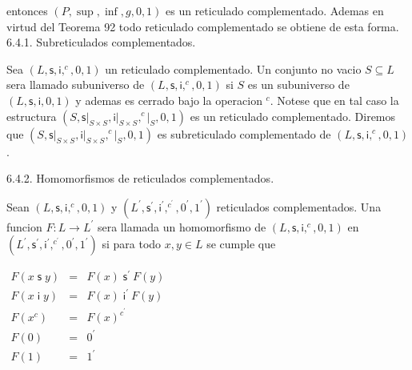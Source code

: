 entonces \((P,\sup ,\inf ,g,0,1)\) es un reticulado complementado. Ademas en virtud del Teorema 92 todo reticulado complementado se obtiene de esta forma.
6.4.1. Subreticulados complementados.

Sea \((L,\mathsf{s},\mathsf{i},^{c},0,1)\) un reticulado complementado. Un conjunto no vacio \(S\subseteq L\) sera llamado subuniverso de \((L, \mathsf{s},\mathsf{i},^{c},0,1)\) si \(S\) es un subuniverso de \((L,\mathsf{s}, \mathsf{i},0,1)\) y ademas es cerrado bajo la operacion \(^{c}\). Notese que en tal caso la estructura \((S,\mathsf{s}\mathrm{\mid }_{S\times S},\mathsf{i} \mathrm{\mid }_{S\times S},^{c}\mathrm{\mid }_{S},0,1)\) es un reticulado complementado. Diremos que \((S,\mathsf{s}\mathrm{\mid }_{S\times S},\mathsf{i }\mathrm{\mid }_{S\times S},^{c}\mathrm{\mid }_{S},0,1)\) es subreticulado complementado de \((L,\mathsf{s},\mathsf{i},^{c},0,1)\).

6.4.2. Homomorfismos de reticulados complementados.

Sean \((L,\mathsf{s},\mathsf{i},^{c},0,1)\) y \((L^{\prime },\mathsf{s}^{\prime },\mathsf{i}^{\prime },^{c^{\prime }},0^{\prime },1^{\prime })\) reticulados complementados. Una funcion \(F:L\rightarrow L^{\prime }\) sera llamada un homomorfismo de \((L,\mathsf{s},\mathsf{i},^{c},0,1)\) en \( (L^{\prime },\mathsf{s}^{\prime },\mathsf{i}^{\prime },^{c^{\prime }},0^{\prime },1^{\prime })\) si para todo \(x,y\in L\) se cumple que

\(\displaystyle \begin{array}{rcl} F(x\mathsf{\;s\;}y) & =& F(x)\;\mathsf{s}^{\prime }\ F(y) \\ F(x\mathsf{\;i\;}y) & =& F(x)\;\mathsf{i}^{\prime }\ F(y) \\ F(x^{c}) & =& F(x)^{c^{\prime }} \\ F(0) & =& 0^{\prime } \\ F(1) & =& 1^{\prime } \end{array} \)

